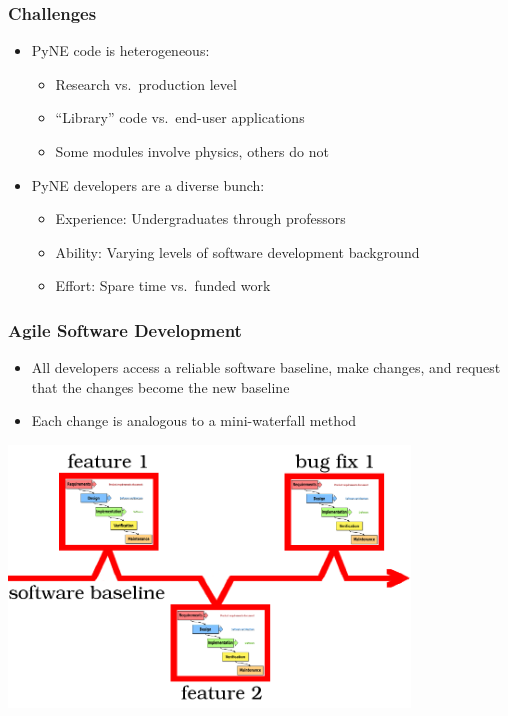 \documentclass[12pt]{beamer}
\begin{document}
\begin{frame}[fragile]
\frametitle{Challenges}

\begin{itemize}
\item{PyNE code is heterogeneous:}
    \begin{itemize}
    \item{Research vs.\ production level}
    \item{``Library'' code vs.\ end-user applications}
    \item{Some modules involve physics, others do not}
    \end{itemize}
\item{PyNE developers are a diverse bunch}:
   \begin{itemize}
   \item{Experience: Undergraduates through professors}
   \item{Ability: Varying levels of software development background}
   \item{Effort: Spare time vs.\ funded work}
   \end{itemize}
\end{itemize}

\end{frame}
\begin{frame}
\frametitle{Agile Software Development\cite{larman2004agile}}

\begin{itemize}
\item{All developers access a reliable software baseline, make changes, and request that the changes become the new baseline}
\item{Each change is analogous to a mini-waterfall method}
\end{itemize}

\centerline{\includegraphics[width=0.8\textwidth]{figures/agile.png}}

\end{frame}
\end{document}
